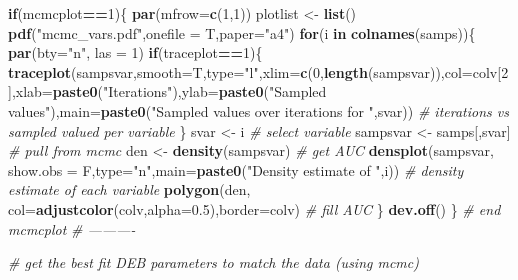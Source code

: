 \documentclass[10,portrait]{article}
\newenvironment{Shaded}{\begin{snugshade}}{\end{snugshade}}
\newcommand{\KeywordTok}[1]{\textcolor[rgb]{0.13,0.29,0.53}{\textbf{#1}}}
\newcommand{\DataTypeTok}[1]{\textcolor[rgb]{0.13,0.29,0.53}{#1}}
\newcommand{\DecValTok}[1]{\textcolor[rgb]{0.00,0.00,0.81}{#1}}
\newcommand{\FloatTok}[1]{\textcolor[rgb]{0.00,0.00,0.81}{#1}}
\newcommand{\StringTok}[1]{\textcolor[rgb]{0.31,0.60,0.02}{#1}}
\newcommand{\CommentTok}[1]{\textcolor[rgb]{0.56,0.35,0.01}{\textit{#1}}}
\newcommand{\ControlFlowTok}[1]{\textcolor[rgb]{0.13,0.29,0.53}{\textbf{#1}}}
\newcommand{\OperatorTok}[1]{\textcolor[rgb]{0.81,0.36,0.00}{\textbf{#1}}}
\newcommand{\NormalTok}[1]{#1}
\begin{document}
\begin{Shaded}
\begin{Highlighting}[]
\ControlFlowTok{if}\NormalTok{(mcmcplot}\OperatorTok{==}\DecValTok{1}\NormalTok{)\{}
  \KeywordTok{par}\NormalTok{(}\DataTypeTok{mfrow=}\KeywordTok{c}\NormalTok{(}\DecValTok{1}\NormalTok{,}\DecValTok{1}\NormalTok{))}
\NormalTok{  plotlist <-}\StringTok{ }\KeywordTok{list}\NormalTok{()}
  \KeywordTok{pdf}\NormalTok{(}\StringTok{"mcmc_vars.pdf"}\NormalTok{,}\DataTypeTok{onefile =}\NormalTok{ T,}\DataTypeTok{paper=}\StringTok{"a4"}\NormalTok{)}
  \ControlFlowTok{for}\NormalTok{(i }\ControlFlowTok{in} \KeywordTok{colnames}\NormalTok{(samps))\{}
    \KeywordTok{par}\NormalTok{(}\DataTypeTok{bty=}\StringTok{"n"}\NormalTok{, }\DataTypeTok{las =} \DecValTok{1}\NormalTok{)}
    \ControlFlowTok{if}\NormalTok{(traceplot}\OperatorTok{==}\DecValTok{1}\NormalTok{)\{}
      \KeywordTok{traceplot}\NormalTok{(sampsvar,}\DataTypeTok{smooth=}\NormalTok{T,}\DataTypeTok{type=}\StringTok{"l"}\NormalTok{,}\DataTypeTok{xlim=}\KeywordTok{c}\NormalTok{(}\DecValTok{0}\NormalTok{,}\KeywordTok{length}\NormalTok{(sampsvar)),}\DataTypeTok{col=}\NormalTok{colv[}\DecValTok{2}\NormalTok{],}\DataTypeTok{xlab=}\KeywordTok{paste0}\NormalTok{(}\StringTok{"Iterations"}\NormalTok{),}\DataTypeTok{ylab=}\KeywordTok{paste0}\NormalTok{(}\StringTok{"Sampled values"}\NormalTok{),}\DataTypeTok{main=}\KeywordTok{paste0}\NormalTok{(}\StringTok{"Sampled values over iterations for "}\NormalTok{,svar)) }\CommentTok{# iterations vs sampled valued per variable}
\NormalTok{    \}}
\NormalTok{    svar <-}\StringTok{ }\NormalTok{i }\CommentTok{# select variable }
\NormalTok{    sampsvar <-}\StringTok{ }\NormalTok{samps[,svar] }\CommentTok{# pull from mcmc}
\NormalTok{    den <-}\StringTok{ }\KeywordTok{density}\NormalTok{(sampsvar) }\CommentTok{# get AUC}
    \KeywordTok{densplot}\NormalTok{(sampsvar, }\DataTypeTok{show.obs =}\NormalTok{ F,}\DataTypeTok{type=}\StringTok{"n"}\NormalTok{,}\DataTypeTok{main=}\KeywordTok{paste0}\NormalTok{(}\StringTok{"Density estimate of "}\NormalTok{,i)) }\CommentTok{# density estimate of each variable}
    \KeywordTok{polygon}\NormalTok{(den, }\DataTypeTok{col=}\KeywordTok{adjustcolor}\NormalTok{(colv,}\DataTypeTok{alpha=}\FloatTok{0.5}\NormalTok{),}\DataTypeTok{border=}\NormalTok{colv) }\CommentTok{# fill AUC }
\NormalTok{  \}}
  \KeywordTok{dev.off}\NormalTok{()}
\NormalTok{\} }\CommentTok{# end mcmcplot}
\CommentTok{# ----------}

\CommentTok{# get the best fit DEB parameters to match the data (using mcmc)}


\end{Highlighting}
\end{Shaded}
\end{document}
